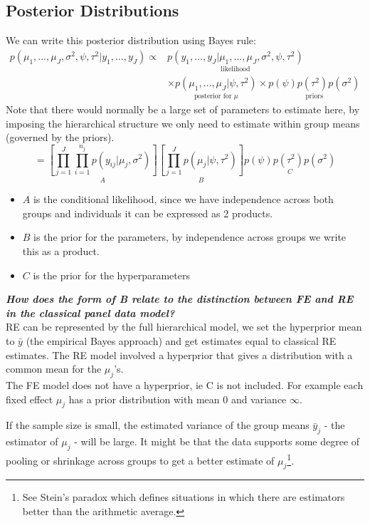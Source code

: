 \documentclass[DIV=14,titlepage=false]{scrreprt}
\begin{document}
\subsection{Posterior Distributions}
We can write this posterior distribution using Bayes rule:
\begin{align}
    p(\mu_1, \ldots, \mu_J, \sigma^2, \psi, \tau^2|y_1, \ldots, y_J) \propto & \underset{\text{likelihood}}{p(y_1, \ldots, y_J|\mu_1, \ldots, \mu_J, \sigma^2, \psi, \tau^2)} \nonumber \\
    & \times \underset{\text{posterior for }\mu}{p(\mu_1, \ldots, \mu_J| \psi, \tau^2)} \times \underset{\text{priors}}{p(\psi)p(\tau^2)p(\sigma^2)} \label{eq:posterior}
\end{align}
Note that there would normally be a large set of parameters to estimate here, by imposing the hierarchical structure we only need to estimate within group means (governed by the priors).
\[
    = \underset{A}{\left[\prod_{j=1}^J \prod_{i=1}^{n_j} p(y_{ij}|\mu_j, \sigma^2) \right]} \underset{B}{\left[\prod_{j=1}^J p(\mu_j|\psi, \tau^2) \right]} \underset{C}{p(\psi)p(\tau^2)p(\sigma^2)}
\]
\begin{itemize}
    \item $A$ is the conditional likelihood, since we have independence across both groups and individuals it can be expressed as 2 products.
    \item $B$ is the prior for the parameters, by independence across groups we write this as a product.
    \item $C$ is the prior for the hyperparameters
\end{itemize}
\begin{explanation}
\textit{\textbf{How does the form of B relate to the distinction between FE and RE in the classical panel data model?}}\\
RE can be represented by the full hierarchical model, we set the hyperprior mean to $\bar y$ (the empirical Bayes approach) and get estimates equal to classical RE estimates. The RE model involved a hyperprior that gives a distribution with a common mean for the $\mu_j$'s. \\
The FE model does not have a hyperprior, ie C is not included. For example each fixed effect $\mu_j$ has a prior distribution with mean 0 and variance $\infty$.
\end{explanation}
If the sample size is small, the estimated variance of the group means $\bar y_j$ - the estimator of $\mu_j$ - will be large. It might be that the data supports some degree of pooling or shrinkage across groups to get a better estimate of $\mu_j$\footnote{See Stein's paradox which defines situations in which there are estimators better than the arithmetic average.}.
\end{document}
